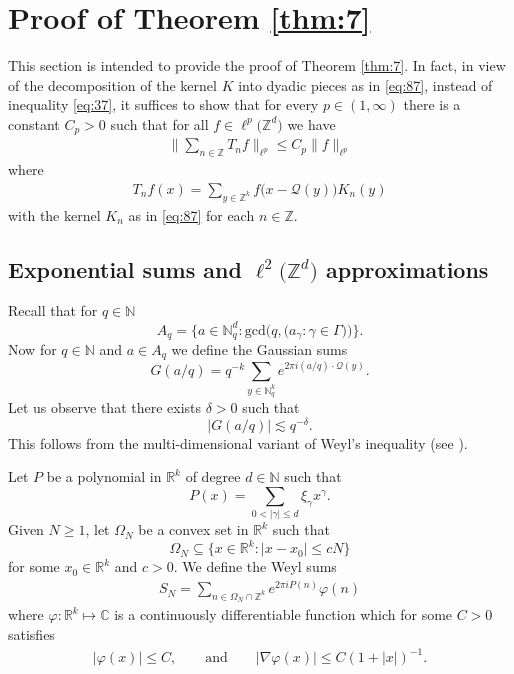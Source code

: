 \documentclass[a4paper,oneside]{amsart}
\theoremstyle{plain}
\theoremstyle{definition}
\numberwithin{equation}{section}
\newcounter{thm}
\theoremstyle{plain}
\newcommand{\RR}{\mathbb{R}}
\newcommand{\ZZ}{\mathbb{Z}}
\newcommand{\CC}{\mathbb{C}}
\newcommand{\NN}{\mathbb{N}}
\newcommand{\calQ}{\mathcal{Q}}
\newcommand{\norm}[1]{{\left\lvert #1 \right\rvert}}
\newcommand{\sprod}[2] {{#1 \cdot #2}}
\newcommand{\8}{\infty}
\begin{document}
\section{Proof of Theorem \ref{thm:7}}
\label{sec:4}
This section is intended to provide the proof of Theorem \ref{thm:7}. 
In fact, in view of the decomposition of the kernel $K$ into dyadic
pieces as in \eqref{eq:87}, instead
of inequality \eqref{eq:37}, it suffices to show that for every $p\in(1, \infty)$
there is a constant $C_p>0$ such that for all
$f\in\ell^p\big(\ZZ^d\big)$ we have
\begin{align}
  \label{eq:84}
\Big\|\sum_{n\in\ZZ}T_nf\Big\|_{\ell^p}\le C_p\|f\|_{\ell^p}  
\end{align}
where 
\begin{align}
  \label{eq:85}
T_n f(x)
=
\sum_{y\in\ZZ^k} f\big(x - \calQ(y)\big) K_n(y)    
\end{align}
with the kernel $K_n$ as in \eqref{eq:87} for each $n\in\ZZ$.





\subsection{Exponential sums and $\ell^2\big(\ZZ^d\big)$ approximations}


 Recall that for $q\in\NN$ 
\[
A_q=\big\{a\in\NN_q^d: \mathrm{gcd}\big(q, \mathrm(a_{\gamma}: \gamma\in\Gamma)\big)\big\}.
\]
Now for $q \in \NN$ and $a \in A_q$ we define the Gaussian sums 
$$
G(a/q) = q^{-k} \sum_{y \in \NN^k_q} e^{2\pi i \sprod{(a/q)}{\calQ(y)}}.
$$
Let us observe that there exists $\delta>0$ such that
\begin{equation}
	\label{eq:20}
	\lvert G(a/q) \rvert \lesssim q^{-\delta}.
\end{equation}
This follows from  the multi-dimensional variant of
Weyl's inequality (see \cite[Proposition 3]{SW0}).


 Let $P$ be a polynomial in $\RR^k$ of degree $d \in\NN$ such that
\[
	P(x) = \sum_{0 < \norm{\gamma} \leq d} \xi_\gamma x^\gamma.
\]
Given $N \geq 1$, let $\Omega_N$ be a convex set in $\RR^k$ such that
\[
	 \Omega_N \subseteq \big\{x \in \RR^k : \norm{x-x_0} \leq cN \big\}
\]
for some $x_0\in\RR^k$ and $c > 0$.
 We define the Weyl sums
\begin{align}
  \label{eq:215}
	S_N = \sum_{n \in \Omega_N \cap \ZZ^k} e^{2\pi i P(n)}\varphi(n)
\end{align}
where  $\varphi:\RR^k\mapsto \CC$ is  a continuously differentiable function which for some $C>0$ satisfies
\begin{align}
  \label{eq:217}
|\varphi(x)|\le C, \qquad \text{and} \qquad |\nabla \varphi(x)|\le C(1+|x|)^{-1}.  
\end{align}
\end{document}
